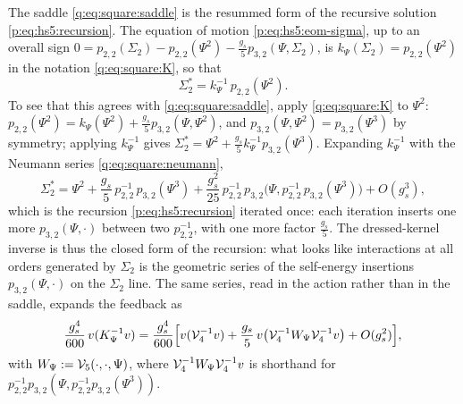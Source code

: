 The saddle \eqref{q:eq:square:saddle} is the resummed form of the recursive solution \eqref{p:eq:hs5:recursion}.
The equation of motion \eqref{p:eq:hs5:eom-sigma}, up to an overall sign $0=p_{2,2}(\Sigma_2)-p_{2,2}(\Psi^2)-\frac{g_s}{5}p_{3,2}(\Psi,\Sigma_2)$, is $k_\Psi(\Sigma_2)=p_{2,2}(\Psi^2)$ in the notation \eqref{q:eq:square:K}, so that
\begin{equation}
  \label{q:eq:square:saddle-R}
  \Sigma_2^*
    = k_\Psi^{-1} \, p_{2,2}(\Psi^2).
\end{equation}
To see that this agrees with \eqref{q:eq:square:saddle}, apply \eqref{q:eq:square:K} to $\Psi^2$: $p_{2,2}(\Psi^2)=k_\Psi(\Psi^2)+\frac{g_s}{5}p_{3,2}(\Psi,\Psi^2)$, and $p_{3,2}(\Psi,\Psi^2)=p_{3,2}(\Psi^3)$ by symmetry; applying $k_\Psi^{-1}$ gives $\Sigma_2^*=\Psi^2+\frac{g_s}{5}k_\Psi^{-1}p_{3,2}(\Psi^3)$.
Expanding $k_\Psi^{-1}$ with the Neumann series \eqref{q:eq:square:neumann},
\begin{equation}
  \label{q:eq:square:recursion}
  \Sigma_2^*
    = \Psi^2
      + \frac{g_s}{5} \, p_{2,2}^{-1} \, p_{3,2}(\Psi^3)
      + \frac{g_s^2}{25} \, p_{2,2}^{-1} \, p_{3,2}\Big( \Psi, p_{2,2}^{-1} \, p_{3,2}(\Psi^3) \Big)
      + O(g_s^3),
\end{equation}
which is the recursion \eqref{p:eq:hs5:recursion} iterated once: each iteration inserts one more $p_{3,2}(\Psi,\cdot)$ between two $p_{2,2}^{-1}$, with one more factor $\frac{g_s}{5}$.
The dressed-kernel inverse is thus the closed form of the recursion: what looks like interactions at all orders generated by $\Sigma_2$ is the geometric series of the self-energy insertions $p_{3,2}(\Psi,\cdot)$ on the $\Sigma_2$ line.
The same series, read in the action rather than in the saddle, expands the feedback as
\begin{equation}
  \frac{g_s^4}{600} \, v(K_\Psi^{-1} v)
    = \frac{g_s^4}{600} \Big[
      v({\mathcal{V}}_4^{-1} v)
      + \frac{g_s}{5} \, v\big({\mathcal{V}}_4^{-1} W_\Psi {\mathcal{V}}_4^{-1} v\big)
      + O(g_s^2)
    \Big],
\end{equation}
with $W_\Psi:={\mathcal{V}}_5(\cdot,\cdot,\Psi)$, where ${\mathcal{V}}_4^{-1}W_\Psi{\mathcal{V}}_4^{-1}v$ is shorthand for $p_{2,2}^{-1}p_{3,2}(\Psi,p_{2,2}^{-1}p_{3,2}(\Psi^3))$.

